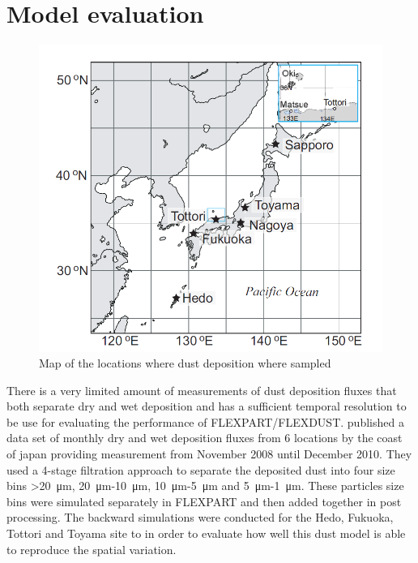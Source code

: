 \section{Model evaluation}\label{sec:model_eval}
\begin{figure}
    \centering
    \includegraphics[scale=0.45]{texfiles/figs/Osada_locations.PNG}
    \caption{Map of the locations where dust deposition where sampled \parencite{osada2014wet}}
    \label{fig:map_japan}
\end{figure}
There is a very limited amount of measurements of dust deposition fluxes that both separate dry and wet deposition and has a sufficient temporal resolution to be use for evaluating the performance of FLEXPART/FLEXDUST. \textcite{osada2014wet} published a data set of monthly dry and wet deposition fluxes from 6 locations by the coast of japan providing measurement from November 2008 until December 2010. They used a 4-stage filtration approach to separate the deposited dust into four size bins  >\SI{20}{\micro\metre}, \SI{20}{\micro\metre}-\SI{10}{\micro\metre}, \SI{10}{\micro\metre}-\SI{5}{\micro\metre} and \SI{5}{\micro\metre}-\SI{1}{\micro\metre}. These particles size bins were simulated separately in FLEXPART and then added together in post processing. The backward simulations were conducted for the Hedo, Fukuoka, Tottori and Toyama site to in order to evaluate how well this dust model is able to reproduce the spatial variation. 

